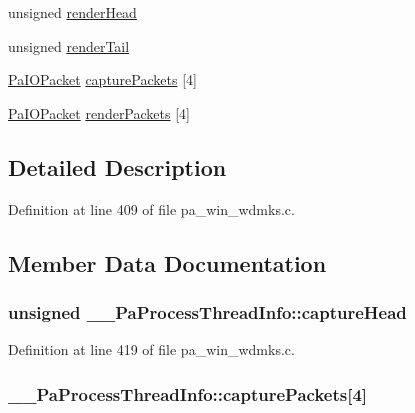 \begin{DoxyCompactItemize}
\item 
unsigned \hyperlink{struct_____pa_process_thread_info_afaabcdb7ba9f573a5ccb51ad217d9786}{render\+Head}
\item 
unsigned \hyperlink{struct_____pa_process_thread_info_a46af18819185c66ad788396981ea7b75}{render\+Tail}
\item 
\hyperlink{pa__win__wdmks_8c_a124673d3110129eeef30c4dddbf2ed2e}{Pa\+I\+O\+Packet} \hyperlink{struct_____pa_process_thread_info_ac4bc0cbbaebc5a15285da84261d50e81}{capture\+Packets} \mbox{[}4\mbox{]}
\item 
\hyperlink{pa__win__wdmks_8c_a124673d3110129eeef30c4dddbf2ed2e}{Pa\+I\+O\+Packet} \hyperlink{struct_____pa_process_thread_info_a174161d8cef2629818fd34a192578992}{render\+Packets} \mbox{[}4\mbox{]}
\end{DoxyCompactItemize}


\subsection{Detailed Description}


Definition at line 409 of file pa\+\_\+win\+\_\+wdmks.\+c.



\subsection{Member Data Documentation}
\subsubsection[{\texorpdfstring{capture\+Head}{captureHead}}]{\setlength{\rightskip}{0pt plus 5cm}unsigned \+\_\+\+\_\+\+Pa\+Process\+Thread\+Info\+::capture\+Head}\hypertarget{struct_____pa_process_thread_info_a1f40d5b9b559f02e1a60c3aafb577038}{}\label{struct_____pa_process_thread_info_a1f40d5b9b559f02e1a60c3aafb577038}


Definition at line 419 of file pa\+\_\+win\+\_\+wdmks.\+c.

\subsubsection[{\texorpdfstring{capture\+Packets}{capturePackets}}]{ \+\_\+\+\_\+\+Pa\+Process\+Thread\+Info\+::capture\+Packets\mbox{[}4\mbox{]}}\hypertarget{struct_____pa_process_thread_info_ac4bc0cbbaebc5a15285da84261d50e81}{}\label{struct_____pa_process_thread_info_ac4bc0cbbaebc5a15285da84261d50e81}


